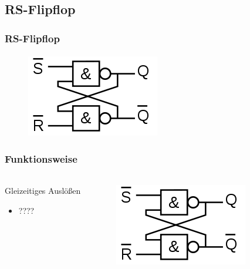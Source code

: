 \subsection{RS-Flipflop} %
\label{sub:RS-Flipflop}
\begin{frame}
    \frametitle{RS-Flipflop}
    \framesubtitle{}
    \begin{figure}[H]
    \begin{center}
            \includegraphics[scale=0.5]{./img/schaltung/RS-FF.png}
    \end{center}
    \end{figure}
\end{frame}
\begin{frame}
    \frametitle{Funktionsweise}
    \framesubtitle{}
    \begin{columns}[c]
            \begin{block}{Gleizeitiges Auslößen}
                \begin{itemize}
                    \item ????
                \end{itemize}
            \end{block}
            \begin{figure}[H]
            \begin{center}
                    \includegraphics[scale=0.5]{./img/schaltung/RS-FF.png}
            \end{center}
            \end{figure}
    \end{columns}
\end{frame}
